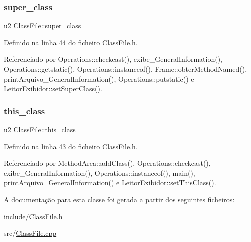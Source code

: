 \mbox{\label{classClassFile_a5f6c11c0ccb02fd992b5c102725253ec}} 
\subsubsection{\texorpdfstring{super\+\_\+class}{super\_class}}
{\footnotesize\ttfamily \hyperlink{BasicTypes_8h_a732cde1300aafb73b0ea6c2558a7a54f}{u2} Class\+File\+::super\+\_\+class}



Definido na linha 44 do ficheiro Class\+File.\+h.



Referenciado por Operations\+::checkcast(), exibe\+\_\+\+General\+Information(), Operations\+::getstatic(), Operations\+::instanceof(), Frame\+::obter\+Method\+Named(), print\+Arquivo\+\_\+\+General\+Information(), Operations\+::putstatic() e Leitor\+Exibidor\+::set\+Super\+Class().

\mbox{\label{classClassFile_a2d33db0a560a71b94bc572dd1e4ec03a}} 
\subsubsection{\texorpdfstring{this\+\_\+class}{this\_class}}
{\footnotesize\ttfamily \hyperlink{BasicTypes_8h_a732cde1300aafb73b0ea6c2558a7a54f}{u2} Class\+File\+::this\+\_\+class}



Definido na linha 43 do ficheiro Class\+File.\+h.



Referenciado por Method\+Area\+::add\+Class(), Operations\+::checkcast(), exibe\+\_\+\+General\+Information(), Operations\+::instanceof(), main(), print\+Arquivo\+\_\+\+General\+Information() e Leitor\+Exibidor\+::set\+This\+Class().



A documentação para esta classe foi gerada a partir dos seguintes ficheiros\+:\begin{DoxyCompactItemize}
\item 
include/\hyperlink{ClassFile_8h}{Class\+File.\+h}\item 
src/\hyperlink{ClassFile_8cpp}{Class\+File.\+cpp}\end{DoxyCompactItemize}
